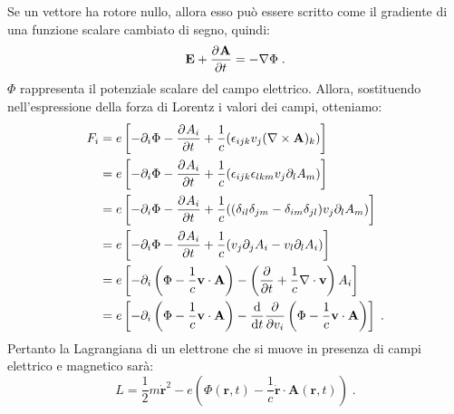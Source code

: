 Se un vettore ha rotore nullo, allora esso può essere scritto come il gradiente di una funzione scalare cambiato di segno, quindi:
\begin{equation}
\mathbf{E}+\pdev{\mathbf{A}}{t}=-\nabla\Phi\;.
\end{equation}
$\Phi$ rappresenta il potenziale scalare del campo elettrico. Allora, sostituendo nell'espressione della forza di Lorentz i valori dei campi, otteniamo:
\begin{align}
F_i&=e\left[-\partial_i\Phi-\pdev{A_i}{t}+\frac{1}{c}(\epsilon_{ijk}v_j(\nabla\times\mathbf{A})_k)\right] \notag \\
&=e\left[-\partial_i\Phi-\pdev{A_i}{t}+\frac{1}{c}(\epsilon_{ijk}\epsilon_{lkm}v_j\partial_lA_m)\right] \notag \\
&=e\left[-\partial_i\Phi-\pdev{A_i}{t}+\frac{1}{c}((\delta_{il}\delta_{jm}-\delta_{im}\delta_{jl})v_j\partial_lA_m)\right] \notag \\
&=e\left[-\partial_i\Phi-\pdev{A_i}{t}+\frac{1}{c}(v_j\partial_jA_i-v_l\partial_lA_i)\right] \notag \\
&=e\left[-\partial_i\left(\Phi-\frac{1}{c}\mathbf{v}\cdot\mathbf{A}\right)-\left(\frac{\partial}{\partial t}+\frac{1}{c}\nabla\cdot\mathbf{v}\right)A_i\right] \notag \\
&=e\left[-\partial_i\left(\Phi-\frac{1}{c}\mathbf{v}\cdot\mathbf{A}\right)-\frac{\diff}{\diff[t]}\frac{\partial}{\partial v_i}\left(\Phi-\frac{1}{c}\mathbf{v}\cdot\mathbf{A}\right)\right]\;.
\end{align}
Pertanto la Lagrangiana di un elettrone che si muove in presenza di campi elettrico e magnetico sarà:
\begin{equation}
L=\frac{1}{2}m\dot{\mathbf{r}}^2-e\left(\Phi(\mathbf{r},t)-\frac{1}{c}\dot{\mathbf{r}}\cdot\mathbf{A}(\mathbf{r},t)\right)\;.
\end{equation}

